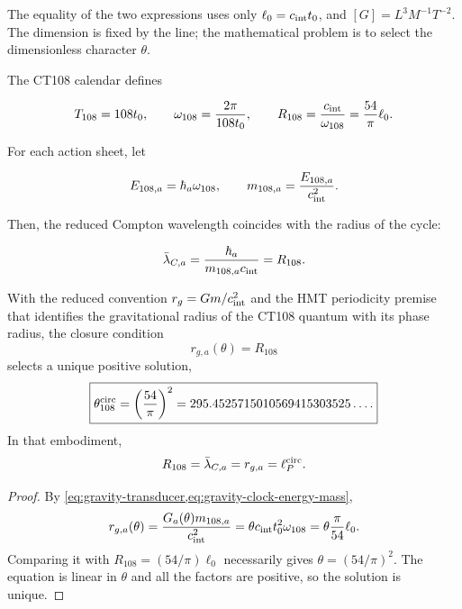 The equality of the two expressions uses only
\(\ell_0=c_{\rm int}t_0\), and
\([G]=L^3M^{-1}T^{-2}\). The dimension is fixed by the line; the
mathematical problem is to select the dimensionless character \(\theta\).

The CT108 calendar defines

\begin{equation}
\label{eq:gravity-clock108}
T_{108}=108t_0,
\qquad
\omega_{108}=\frac{2\pi}{108t_0},
\qquad
R_{108}=\frac{c_{\rm int}}{\omega_{108}}
=\frac{54}{\pi}\ell_0.
\end{equation}

For each action sheet, let

\begin{equation}
\label{eq:gravity-clock-energy-mass}
E_{108,a}=\hbar_a\omega_{108},
\qquad
m_{108,a}=\frac{E_{108,a}}{c_{\rm int}^2}.
\end{equation}

Then, the reduced Compton wavelength coincides with the radius of the cycle:

\begin{equation}
\label{eq:gravity-compton-clock}
\bar\lambda_{C,a}
=\frac{\hbar_a}{m_{108,a}c_{\rm int}}
=R_{108}.
\end{equation}

\begin{theorem}
\label{thm:gravity-circular-selector}
With the reduced convention
\(r_g=Gm/c_{\rm int}^2\) and the HMT periodicity premise that identifies the gravitational
radius of the CT108 quantum with its phase radius, the closure condition
\begin{equation}
\label{eq:gravity-closing-condition}
r_{g,a}(\theta)=R_{108}
\end{equation}
selects a unique positive solution,
\begin{equation}
\label{eq:gravity-theta108}
\boxed{
\theta_{108}^{\rm circ}=\left(\frac{54}{\pi}\right)^2
=295.4525715010569415303525\ldots .}
\end{equation}
In that embodiment,
\begin{equation}
\label{eq:gravity-four-lengths}
R_{108}=\bar\lambda_{C,a}=r_{g,a}=\ell_P^{\rm circ}.
\end{equation}
\end{theorem}

\begin{proof}
By \cref{eq:gravity-transducer,eq:gravity-clock-energy-mass},
\[
r_{g,a}(\theta)
=\frac{G_a(\theta)m_{108,a}}{c_{\rm int}^2}
=\theta c_{\rm int}t_0^2\omega_{108}
=\theta\frac{\pi}{54}\ell_0.
\]
Comparing it with
\(R_{108}=(54/\pi)\ell_0\) necessarily gives
\(\theta=(54/\pi)^2\). The equation is linear in \(\theta\) and all the
factors are positive, so the solution is unique.
\end{proof}

